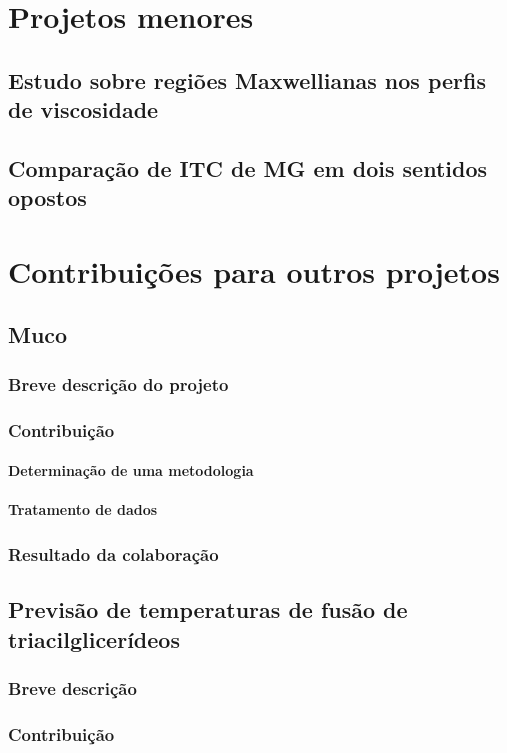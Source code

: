 	
\part{Projetos menores}
	\chapter{Estudo sobre regiões Maxwellianas nos perfis de viscosidade}
	\chapter{Comparação de ITC de MG em dois sentidos opostos}
	
	
\part{Contribuições para outros projetos}
	\chapter{Muco}
		\section{Breve descrição do projeto}
		\section{Contribuição}
			\subsection{Determinação de uma metodologia}
			\subsection{Tratamento de dados}
		\section{Resultado da colaboração}
	\chapter{Previsão de temperaturas de fusão de triacilglicerídeos}
		\section{Breve descrição}
		\section{Contribuição}
